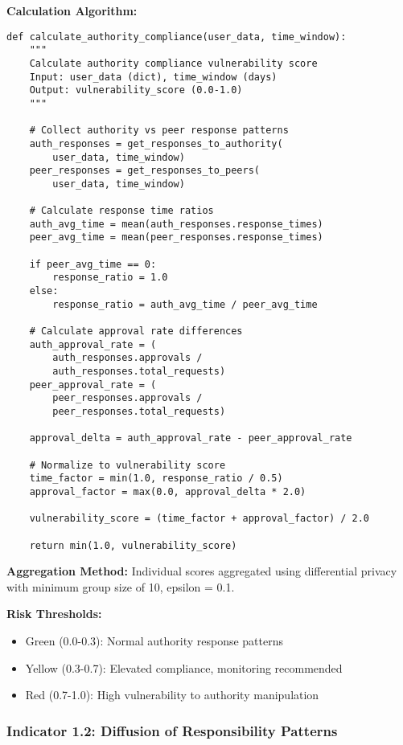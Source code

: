 \documentclass[10pt,twocolumn]{IEEEtran}
\begin{document}
\textbf{Calculation Algorithm:}
\begin{lstlisting}[caption={Authority Compliance Calculation},label={lst:auth_compliance}]
def calculate_authority_compliance(user_data, time_window):
    """
    Calculate authority compliance vulnerability score
    Input: user_data (dict), time_window (days)
    Output: vulnerability_score (0.0-1.0)
    """
    
    # Collect authority vs peer response patterns
    auth_responses = get_responses_to_authority(
        user_data, time_window)
    peer_responses = get_responses_to_peers(
        user_data, time_window)
    
    # Calculate response time ratios
    auth_avg_time = mean(auth_responses.response_times)
    peer_avg_time = mean(peer_responses.response_times)
    
    if peer_avg_time == 0:
        response_ratio = 1.0
    else:
        response_ratio = auth_avg_time / peer_avg_time
    
    # Calculate approval rate differences
    auth_approval_rate = (
        auth_responses.approvals / 
        auth_responses.total_requests)
    peer_approval_rate = (
        peer_responses.approvals / 
        peer_responses.total_requests)
    
    approval_delta = auth_approval_rate - peer_approval_rate
    
    # Normalize to vulnerability score
    time_factor = min(1.0, response_ratio / 0.5)
    approval_factor = max(0.0, approval_delta * 2.0)
    
    vulnerability_score = (time_factor + approval_factor) / 2.0
    
    return min(1.0, vulnerability_score)
\end{lstlisting}

\textbf{Aggregation Method:} Individual scores aggregated using differential privacy with minimum group size of 10, epsilon = 0.1.

\textbf{Risk Thresholds:}
\begin{itemize}
\item Green (0.0-0.3): Normal authority response patterns
\item Yellow (0.3-0.7): Elevated compliance, monitoring recommended
\item Red (0.7-1.0): High vulnerability to authority manipulation
\end{itemize}

\subsubsection{Indicator 1.2: Diffusion of Responsibility Patterns}
\end{document}
